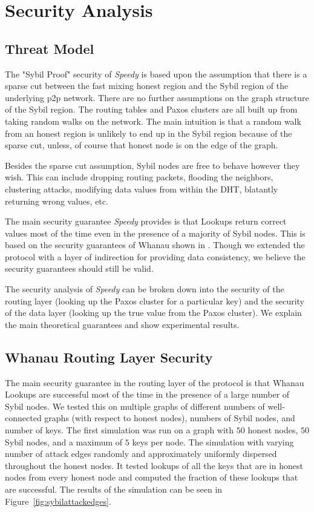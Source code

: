 \documentclass[letter]{article}
\newcommand{\sys}{\textit{Speedy}}
\begin{document}
\section{Security Analysis}

\subsection{Threat Model}
The "Sybil Proof" security of \sys{} is based upon the assumption that there is a sparse cut between the fast mixing honest region and the Sybil region of the underlying p2p network. There are no further assumptions on the graph structure of the Sybil region. The routing tables and Paxos clusters are all built up from taking random walks on the network. The main intuition is that a random walk from an honest region is unlikely to end up in the Sybil region because of the sparse cut, unless, of course that honest node is on the edge of the graph.

Besides the sparse cut assumption, Sybil nodes are free to behave however they wish. This can include dropping routing packets, flooding the neighbors, clustering attacks, modifying data values from within the DHT, blatantly returning wrong values, etc.

The main security guarantee \sys{} provides is that Lookups return correct values most of the time even in the presence of a majority of Sybil nodes. This is based on the security guarantees of Whanau shown in \cite{whanau}. Though we extended the protocol with a layer of indirection for providing data consistency, we believe the security guarantees should still be valid.

The security analysis of \sys{} can be broken down into the security of the routing layer (looking up the Paxos cluster for a particular key) and the security of the data layer (looking up the true value from the Paxos cluster). We explain the main theoretical guarantees and show experimental results.

\subsection{Whanau Routing Layer Security}
The main security guarantee in the routing layer of the protocol is that Whanau Lookups are successful most of the time in the presence of a large number of Sybil nodes. We tested this on multiple graphs of different numbers of well-connected graphs (with respect to honest nodes), numbers of Sybil nodes, and number of keys. The first simulation was run on a graph with $50$ honest nodes, $50$ Sybil nodes, and a maximum of $5$ keys per node. The simulation with varying number of attack edges randomly and approximately uniformly dispersed throughout the honest nodes. It tested lookups of all the keys that are in honest nodes from every honest node and computed the fraction of these lookups that are successful. The results of the simulation can be seen in Figure~\ref{fig:sybilattackedges}.
\end{document}
